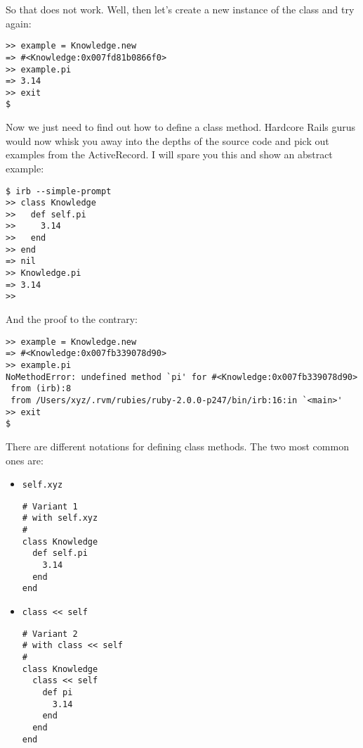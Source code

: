\documentclass[a4paper]{book}
\begin{document}
So that does not work. Well, then let's create a new instance of the class and try again:

\begin{shaded}\begin{verbatim}
>> example = Knowledge.new
=> #<Knowledge:0x007fd81b0866f0>
>> example.pi
=> 3.14
>> exit
$
\end{verbatim}\end{shaded}

Now we just need to find out how to define a class method. Hardcore Rails gurus would now whisk you away into the depths of the source code and pick out examples from the ActiveRecord. I will spare you this and show an abstract example:

\begin{shaded}\begin{verbatim}
$ irb --simple-prompt
>> class Knowledge
>>   def self.pi
>>     3.14
>>   end
>> end
=> nil
>> Knowledge.pi
=> 3.14
>>
\end{verbatim}\end{shaded}

And the proof to the contrary:

\begin{shaded}\begin{verbatim}
>> example = Knowledge.new
=> #<Knowledge:0x007fb339078d90>
>> example.pi
NoMethodError: undefined method `pi' for #<Knowledge:0x007fb339078d90>
 from (irb):8
 from /Users/xyz/.rvm/rubies/ruby-2.0.0-p247/bin/irb:16:in `<main>'
>> exit
$
\end{verbatim}\end{shaded}

There are different notations for defining class methods. The two most common ones are:

\begin{itemize}
\item
  \texttt{self.xyz}

\begin{shaded}\begin{verbatim}
# Variant 1
# with self.xyz
#
class Knowledge
  def self.pi
    3.14
  end
end
\end{verbatim}\end{shaded}
\item
  \texttt{class \textless{}\textless{} self}

\begin{shaded}\begin{verbatim}
# Variant 2
# with class << self
#
class Knowledge
  class << self
    def pi
      3.14
    end
  end
end
\end{verbatim}\end{shaded}
\end{itemize}
\end{document}
